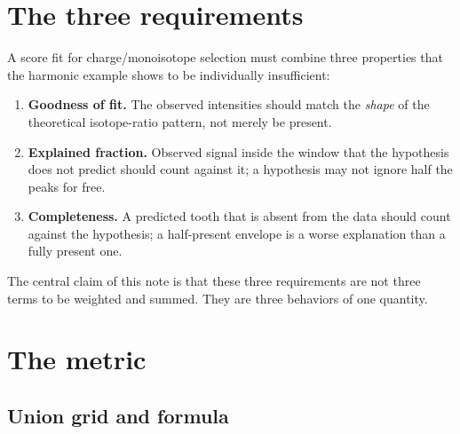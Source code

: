 \documentclass[11pt]{article}
\begin{document}
\section{The three requirements}
\label{sec:requirements}

A score fit for charge/monoisotope selection must combine three properties that the
harmonic example shows to be individually insufficient:
\begin{enumerate}[label=\textbf{P\arabic*.},leftmargin=3.2em]
  \item \textbf{Goodness of fit.} The observed intensities should match the
  \emph{shape} of the theoretical isotope-ratio pattern, not merely be present.
  \item \textbf{Explained fraction.} Observed signal inside the window that the
  hypothesis does not predict should count against it; a hypothesis may not ignore
  half the peaks for free.
  \item \textbf{Completeness.} A predicted tooth that is absent from the data should
  count against the hypothesis; a half-present envelope is a worse explanation than
  a fully present one.
\end{enumerate}
The central claim of this note is that these three requirements are not three terms
to be weighted and summed. They are three behaviors of one quantity.

\section{The metric}
\label{sec:metric}

\subsection{Union grid and formula}
\end{document}
